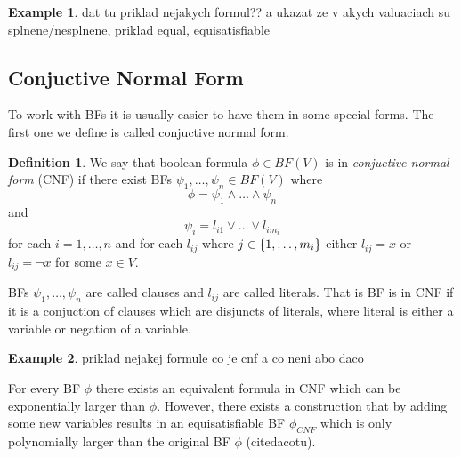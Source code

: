 \documentclass[
  digital, %
  twoside, %
  table,   %
  nolof,     %
  nolot,     %
]{fithesis3}
\let\setbuilder\set
\newcommand{\simpleset}[1]{\{{#1}\}}
\renewcommand{\set}[1]{\normalexpandarg\IfSubStr{#1}{|}{\setbuilder{#1}}{\simpleset{#1}}}
\theoremstyle{definition}
\newtheorem{definition}{Definition}
\newtheorem{example}{Example}
\theoremstyle{remark}
\newcommand{\BF}[1]{BF(#1)}
\begin{document}
\begin{example}
dat tu priklad nejakych formul?? a ukazat ze v akych valuaciach su splnene/nesplnene, priklad equal, equisatisfiable
\end{example}

\subsection{Conjuctive Normal Form}
\label{sec:BF:CNF}
To work with BFs it is usually easier to have them in some special forms. The first one we define is called conjuctive normal form.

\begin{definition}
We say that boolean formula $\phi \in \BF{V}$ is in \emph{conjuctive normal form} (CNF) if there exist BFs $\psi_1,\dots,\psi_n \in \BF{V}$ where
\[\phi = \psi_1 \land \dots \land \psi_n\]
and
\[\psi_i = l_{i1} \lor \dots \lor l_{i{m_i}}\]
for each $i = 1, \dots, n$ and for each $l_{ij}$ where $j \in \set{1,\dots,m_i}$ either $l_{ij} = x$ or $l_{ij} = \neg x$ for some $x \in V$.
\end{definition}
BFs $\psi_1,\dots,\psi_n$ are called clauses and $l_{ij}$ are called literals. That is BF is in CNF if it is a conjuction of clauses which are disjuncts of literals, where literal is either a variable or negation of a variable.

\begin{example}
priklad nejakej formule co je cnf a co neni abo daco
\end{example}

For every BF $\phi$ there exists an equivalent formula in CNF which can be exponentially larger than $\phi$. However, there exists a construction that by adding some new variables results in an equisatisfiable BF $\phi_{CNF}$ which is only polynomially larger than the original BF $\phi$ (citedacotu).
\end{document}
